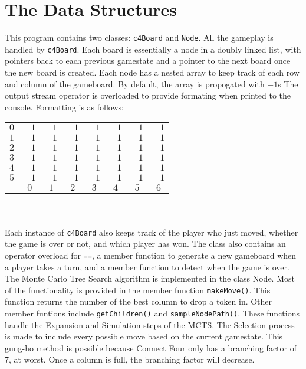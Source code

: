 \documentclass[fleqn]{article}
\begin{document}
  \section{The Data Structures}
  This program contains two classes: \texttt{c4Board} and \texttt{Node}. All the gameplay is handled by \texttt{c4Board}. Each board is essentially a node in a doubly linked list, with pointers back to each previous gamestate and a pointer to the next board once the new board is created. Each node has a nested array to keep track of each row and column of the gameboard. By default, the array is propogated with $-1$s The output stream operator is overloaded to provide formating when printed to the console. Formatting is as follows:  \\
  \begin{tabular}{c | c c c c c c c}
    $0$ &$-1$ &$-1$ &$-1$ &$-1$ &$-1$ &$-1$ &$-1$ \\
    $1$ &$-1$ &$-1$ &$-1$ &$-1$ &$-1$ &$-1$ &$-1$ \\
    $2$ &$-1$ &$-1$ &$-1$ &$-1$ &$-1$ &$-1$ &$-1$ \\
    $3$ &$-1$ &$-1$ &$-1$ &$-1$ &$-1$ &$-1$ &$-1$ \\
    $4$ &$-1$ &$-1$ &$-1$ &$-1$ &$-1$ &$-1$ &$-1$ \\
    $5$ &$-1$ &$-1$ &$-1$ &$-1$ &$-1$ &$-1$ &$-1$ \\
    \hline
        &$0$  & $1$  & $2$  & $3$  & $4$  & $5$  & $6$ \\
  \end{tabular} \\ \\
  Each instance of \texttt{c4Board} also keeps track of the player who just moved, whether the game is over or not, and which player has won. The class also contains an operator overload for \texttt{==}, a member function to generate a new gameboard when a player takes a turn, and a member function to detect when the game is over.\\

  The Monte Carlo Tree Search algorithm is implemented in the class Node. Most of the functionality is provided in the member function \texttt{makeMove()}. This function returns the number of the best column to drop a token in. Other member funtions include \texttt{getChildren()} and \texttt{sampleNodePath()}. These functions handle the Expansion and Simulation steps of the MCTS. The Selection process is made to include every possible move based on the current gamestate. This gung-ho method is possible because Connect Four only has a branching factor of 7, at worst. Once a column is full, the branching factor will decrease. \\
\end{document}
